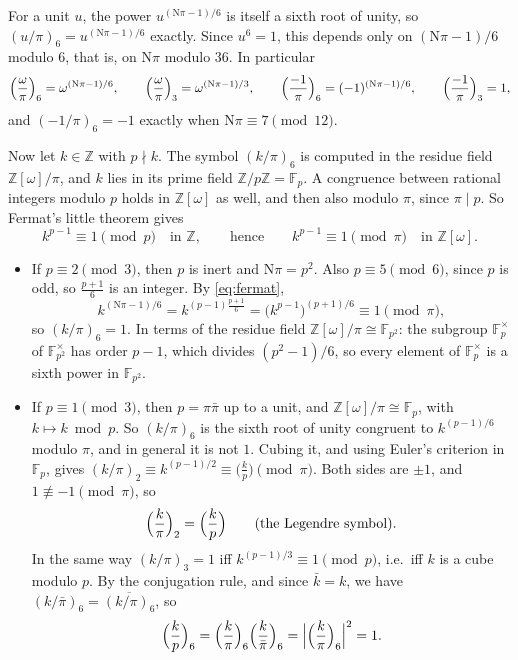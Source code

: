 \documentclass[11pt]{article}
\numberwithin{equation}{section}
\newcommand{\N}{\mathrm N}
\newcommand{\OO}{\mathbb Z[\omega]}
\newcommand{\Z}{\mathbb Z}
\newcommand{\F}{\mathbb F}
\theoremstyle{definition}
\theoremstyle{remark}
\begin{document}
For a unit $u$, the power $u^{(\N\pi-1)/6}$ is itself a sixth root of unity, so
$(u/\pi)_6=u^{(\N\pi-1)/6}$ exactly. Since $u^6=1$, this depends only on $(\N\pi-1)/6$ modulo $6$,
that is, on $\N\pi$ modulo $36$. In particular
\begin{equation}\label{eq:unitsymbols}
 \Bigl(\frac\omega\pi\Bigr)_6=\omega^{(\N\pi-1)/6},\qquad
 \Bigl(\frac\omega\pi\Bigr)_3=\omega^{(\N\pi-1)/3},\qquad
 \Bigl(\frac{-1}\pi\Bigr)_6=(-1)^{(\N\pi-1)/6},\qquad
 \Bigl(\frac{-1}\pi\Bigr)_3=1 ,
\end{equation}
and $(-1/\pi)_6=-1$ exactly when $\N\pi\equiv7\pmod{12}$.

Now let $k\in\Z$ with $p\nmid k$. The symbol $(k/\pi)_6$ is computed in the residue field $\OO/\pi$,
and $k$ lies in its prime field $\Z/p\Z=\F_p$. A congruence between rational integers modulo $p$
holds in $\OO$ as well, and then also modulo $\pi$, since $\pi\mid p$. So Fermat's little theorem gives
\begin{equation}\label{eq:fermat}
 k^{p-1}\equiv1\pmod p\quad\text{in }\Z,\qquad\text{hence}\qquad k^{p-1}\equiv1\pmod\pi\quad\text{in }\OO .
\end{equation}
\begin{itemize}
\item If $p\equiv2\pmod3$, then $p$ is inert and $\N\pi=p^2$. Also $p\equiv5\pmod6$, since $p$ is odd,
so $\frac{p+1}6$ is an integer. By \eqref{eq:fermat},
\begin{equation}\label{eq:inertrational}
 k^{(\N\pi-1)/6}=k^{(p-1)\frac{p+1}6}=\bigl(k^{p-1}\bigr)^{(p+1)/6}\equiv1\pmod\pi ,
\end{equation}
so $(k/\pi)_6=1$. In terms of the residue field $\OO/\pi\cong\F_{p^2}$: the subgroup $\F_p^\times$ of
$\F_{p^2}^\times$ has order $p-1$, which divides $(p^2-1)/6$, so every element of $\F_p^\times$ is a sixth
power in $\F_{p^2}$.
\item If $p\equiv1\pmod3$, then $p=\pi\bar\pi$ up to a unit, and $\OO/\pi\cong\F_p$, with $k\mapsto k\bmod p$.
So $(k/\pi)_6$ is the sixth root of unity congruent to $k^{(p-1)/6}$ modulo $\pi$, and in general it is not
$1$. Cubing it, and using Euler's criterion in $\F_p$, gives $(k/\pi)_2\equiv k^{(p-1)/2}\equiv\bigl(\frac
kp\bigr)\pmod\pi$. Both sides are $\pm1$, and $1\not\equiv-1\pmod\pi$, so
\begin{equation}\label{eq:legendre}
 \Bigl(\frac k\pi\Bigr)_2=\Bigl(\frac kp\Bigr)\qquad\text{(the Legendre symbol)}.
\end{equation}
In the same way $(k/\pi)_3=1$ iff $k^{(p-1)/3}\equiv1\pmod p$, i.e.\ iff $k$ is a cube modulo $p$. By the
conjugation rule, and since $\bar k=k$, we have $(k/\bar\pi)_6=\overline{(k/\pi)_6}$, so
\begin{equation}\label{eq:splitrational}
 \Bigl(\frac kp\Bigr)_6=\Bigl(\frac k\pi\Bigr)_6\Bigl(\frac k{\bar\pi}\Bigr)_6=\Bigl|\Bigl(\frac k\pi\Bigr)_6\Bigr|^2=1 .
\end{equation}
\end{itemize}
\end{document}
